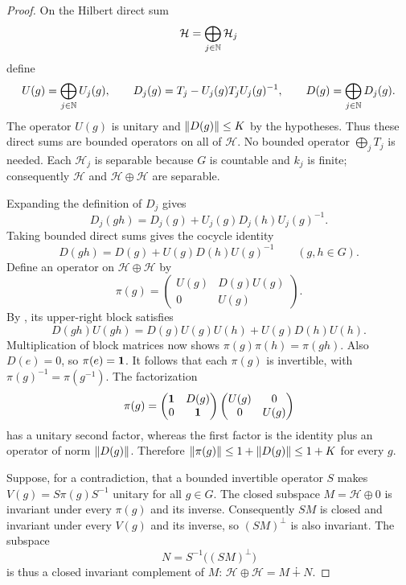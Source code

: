 \begin{proof}
On the Hilbert direct sum
\[
  \mathcal H=\bigoplus_{j\in\mathbb N}\mathcal H_j
\]
define
\[
  U(g)=\bigoplus_{j\in\mathbb N}U_j(g),\qquad
  D_j(g)=T_j-U_j(g)T_jU_j(g)^{-1},\qquad
  D(g)=\bigoplus_{j\in\mathbb N}D_j(g).
\]
The operator $U(g)$ is unitary and $\left\lVert D(g)\right\rVert\le K$ by the
hypotheses.  Thus these direct sums are bounded operators on all of
$\mathcal H$.  No bounded operator $\bigoplus_jT_j$ is needed.
Each $\mathcal H_j$ is separable because $G$ is countable and $k_j$
is finite; consequently $\mathcal H$ and $\mathcal H\oplus\mathcal H$
are separable.

Expanding the definition of $D_j$ gives
\[
  D_j(gh)=D_j(g)+U_j(g)D_j(h)U_j(g)^{-1}.
\]
Taking bounded direct sums gives the cocycle identity
\begin{equation}
\label{eq:direct-sum-cocycle}
  D(gh)=D(g)+U(g)D(h)U(g)^{-1}
  \qquad(g,h\in G).
\end{equation}
Define an operator on $\mathcal H\oplus\mathcal H$ by
\begin{equation}
\label{eq:triangular-representation}
  \pi(g)=
  \begin{pmatrix}
    U(g)&D(g)U(g)\\
    0&U(g)
  \end{pmatrix}.
\end{equation}
By , its upper-right block satisfies
\[
  D(gh)U(gh)
  =D(g)U(g)U(h)+U(g)D(h)U(h).
\]
Multiplication of block matrices now shows
$\pi(g)\pi(h)=\pi(gh)$.
Also $D(e)=0$, so $\pi(e)=\mathbf 1$.
It follows that each $\pi(g)$ is invertible, with
$\pi(g)^{-1}=\pi(g^{-1})$.
The factorization
\[
  \pi(g)=
  \begin{pmatrix}\mathbf 1&D(g)\\0&\mathbf 1\end{pmatrix}
  \begin{pmatrix}U(g)&0\\0&U(g)\end{pmatrix}
\]
has a unitary second factor, whereas the first factor is the
identity plus an operator of norm $\left\lVert D(g)\right\rVert$.
Therefore $\left\lVert\pi(g)\right\rVert\le1+\left\lVert D(g)\right\rVert\le1+K$ for every $g$.

Suppose, for a contradiction, that a bounded invertible operator
$S$ makes $V(g)=S\pi(g)S^{-1}$ unitary for all $g\in G$.
The closed subspace $M=\mathcal H\oplus0$ is invariant under every
$\pi(g)$ and its inverse.  Consequently $SM$ is closed and
invariant under every $V(g)$ and its inverse, so $(SM)^\perp$ is
also invariant.  The subspace
\[
  N=S^{-1}\bigl((SM)^\perp\bigr)
\]
is thus a closed invariant complement of $M$:
$\mathcal H\oplus\mathcal H=M\mathbin{\dotplus}N$.


\end{proof}
